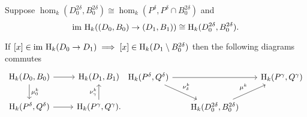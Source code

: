 
\begin{theorem}
    Suppose $\hom_k(D_0^{2\delta}, B_0^{2\delta})\cong \hom_k(P^\delta, P^\delta\cap B_0^{2\delta})$ and \[\mathrm{im}~\mathrm{H}_k((D_0,B_0)\to (D_1,B_1))\cong\mathrm{H}_k(D_0^{2\delta},B_0^{2\delta}).\]

    If $[x]\in\mathrm{im}~\mathrm{H}_k(D_0\to D_1)\implies [x]\in\mathrm{H}_k(D_1\setminus B_0^{2\delta})$ then the following diagrams commutes
    \[\begin{tikzcd}
        \hom_k(D_0, B_0)\arrow{r}\arrow{d}{\mu^k_0} &
        \hom_k(D_1, B_1)\\
        \hom_k(P^\delta, Q^\delta)\arrow{r} &
        \hom_k(P^\gamma, Q^\gamma).\arrow{u}{\nu^k_\gamma}
    \end{tikzcd}
    \begin{tikzcd}[column sep=scriptsize]
        \hom_k(P^\delta, Q^\delta)\arrow{dr}{\nu^k_\delta}\arrow{rr} & &
        \hom_k(P^\gamma, Q^\gamma)\\
        & \hom_k(D_0^{2\delta},B_0^{2\delta})\arrow{ur}{\mu^k}
    \end{tikzcd}\]
\end{theorem}
